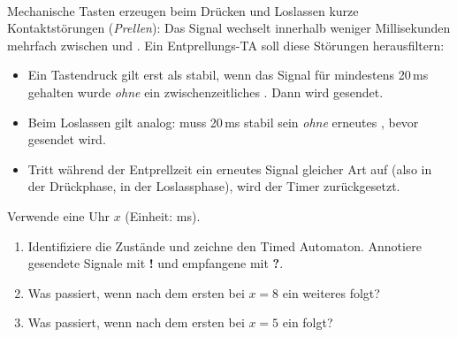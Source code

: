 \umbruchlsg


\\
Mechanische Tasten erzeugen beim Drücken und Loslassen kurze Kontaktstörungen
(\emph{Prellen}): Das Signal wechselt innerhalb weniger Millisekunden mehrfach zwischen
 und . Ein Entprellungs-TA soll diese Störungen herausfiltern:

\begin{itemize}
  \item Ein Tastendruck gilt erst als stabil, wenn das Signal  für mindestens
        20\,ms gehalten wurde \emph{ohne} ein zwischenzeitliches . Dann wird
         gesendet.
  \item Beim Loslassen gilt analog:  muss 20\,ms stabil sein \emph{ohne}
        erneutes , bevor  gesendet wird.
  \item Tritt während der Entprellzeit ein erneutes Signal gleicher Art auf (also
         in der Drückphase,  in der Loslassphase), wird der Timer
        zurückgesetzt.
\end{itemize}

Verwende eine Uhr $x$ (Einheit: ms).

\begin{enumerate}
  \item Identifiziere die Zustände und zeichne den Timed Automaton. Annotiere gesendete
        Signale mit \textbf{!} und empfangene mit \textbf{?}.
  \item Was passiert, wenn nach dem ersten  bei $x = 8$ ein weiteres 
        folgt?
  \item Was passiert, wenn nach dem ersten  bei $x = 5$ ein  folgt?
\end{enumerate}

